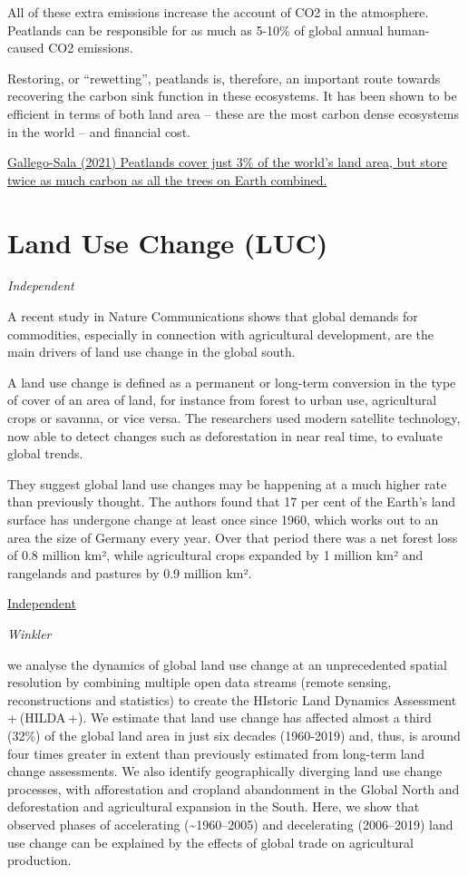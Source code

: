 \documentclass[
]{book}
\begin{document}
All of these extra emissions increase the account of CO2 in the atmosphere. Peatlands can be responsible for as much as 5-10\% of global annual human-caused CO2 emissions.

Restoring, or ``rewetting'', peatlands is, therefore, an important route towards recovering the carbon sink function in these ecosystems. It has been shown to be efficient in terms of both land area -- these are the most carbon dense ecosystems in the world -- and financial cost.

\href{https://www.carbonbrief.org/guest-post-are-the-worlds-peatlands-better-protected-after-cop26}{Gallego-Sala (2021) Peatlands cover just 3\% of the world's land area, but store twice as much carbon as all the trees on Earth combined.}

\hypertarget{land-use-change-luc}{%
\section{Land Use Change (LUC)}\label{land-use-change-luc}}

\emph{Independent}

A recent study in Nature Communications shows that global demands for commodities, especially in connection with agricultural development, are the main drivers of land use change in the global south.

A land use change is defined as a permanent or long-term conversion in the type of cover of an area of land, for instance from forest to urban use, agricultural crops or savanna, or vice versa. The researchers used modern satellite technology, now able to detect changes such as deforestation in near real time, to evaluate global trends.

They suggest global land use changes may be happening at a much higher rate than previously thought. The authors found that 17 per cent of the Earth's land surface has undergone change at least once since 1960, which works out to an area the size of Germany every year. Over that period there was a net forest loss of 0.8 million km², while agricultural crops expanded by 1 million km² and rangelands and pastures by 0.9 million km².

\href{https://www.independent.co.uk/news/science/cause-deforestation-world-global-markets-b1865516.html}{Independent}

\emph{Winkler}

we analyse the dynamics of global land use change at an unprecedented spatial resolution by combining multiple open data streams (remote sensing, reconstructions and statistics) to create the HIstoric Land Dynamics Assessment + (HILDA +). We estimate that land use change has affected almost a third (32\%) of the global land area in just six decades (1960-2019) and, thus, is around four times greater in extent than previously estimated from long-term land change assessments. We also identify geographically diverging land use change processes, with afforestation and cropland abandonment in the Global North and deforestation and agricultural expansion in the South. Here, we show that observed phases of accelerating (\textasciitilde1960--2005) and decelerating (2006--2019) land use change can be explained by the effects of global trade on agricultural production.
\end{document}
